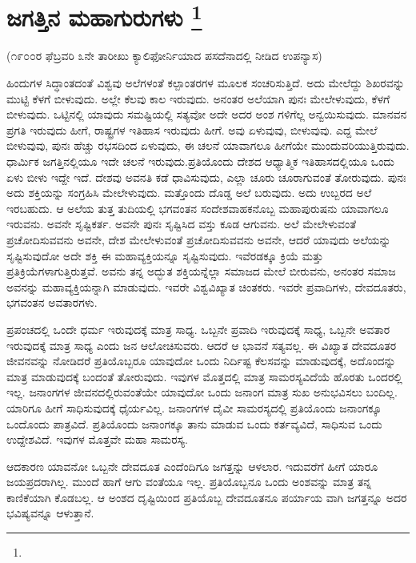 
\chapter[ಜಗತ್ತಿನ ಮಹಾಗುರುಗಳು]{ಜಗತ್ತಿನ ಮಹಾಗುರುಗಳು \protect\footnote{}}

\begin{center}
(೧೯೦೦ರ ಫೆಬ್ರವರಿ ೩ನೇ ತಾರೀಖು ಕ್ಯಾಲಿಫೋರ್ನಿಯಾದ ಪಸದೆನಾದಲ್ಲಿ ನೀಡಿದ ಉಪನ್ಯಾಸ)
\end{center}

ಹಿಂದುಗಳ ಸಿದ್ಧಾಂತದಂತೆ ವಿಶ್ವವು ಅಲೆಗಳಂತೆ ಕಲ್ಪಾಂತರಗಳ ಮೂಲಕ ಸಂಚರಿಸುತ್ತಿದೆ. ಅದು ಮೇಲೆದ್ದು ಶಿಖರವನ್ನು ಮುಟ್ಟಿ ಕೆಳಗೆ ಬೀಳುವುದು. ಅಲ್ಲೇ ಕೆಲವು ಕಾಲ ಇರುವುದು. ಅನಂತರ ಅಲೆಯಾಗಿ ಪುನಃ ಮೇಲೇಳುವುದು, ಕೆಳಗೆ ಬೀಳುವುದು. ಒಟ್ಟಿನಲ್ಲಿ ಯಾವುದು ಸಮಷ್ಟಿಯಲ್ಲಿ ಸತ್ಯವೋ ಅದೇ ಅದರ ಅಂಶ ಗಳಿಗೆಲ್ಲ ಅನ್ವಯಿಸುವುದು. ಮಾನವನ ಪ್ರಗತಿ ಇರುವುದು ಹೀಗೆ, ರಾಷ್ಟ್ರಗಳ ಇತಿಹಾಸ ಇರುವುದು ಹೀಗೆ. ಅವು ಏಳುವುವು, ಬೀಳುವುವು. ಎದ್ದ ಮೇಲೆ ಬೀಳುವುವು, ಪುನಃ ಹೆಚ್ಚು ರಭಸದಿಂದ ಏಳುವುದು, ಈ ಚಲನೆ ಯಾವಾಗಲೂ ಹೀಗೆಯೇ ಮುಂದುವರಿಯುತ್ತಿರುವುದು. ಧಾರ್ಮಿಕ ಜಗತ್ತಿನಲ್ಲಿಯೂ ಇದೇ ಚಲನೆ ಇರುವುದು.ಪ್ರತಿಯೊಂದು ದೇಶದ ಆಧ್ಯಾತ್ಮಿಕ ಇತಿಹಾಸದಲ್ಲಿಯೂ ಒಂದು ಏಳು ಬೀಳು ಇದ್ದೇ ಇದೆ. ದೇಶವು ಅವನತಿ ಕಡೆ ಧಾವಿಸುವುದು, ಎಲ್ಲಾ ಚೂರು ಚೂರಾಗುವಂತೆ ತೋರುವುದು. ಪುನಃ ಅದು ಶಕ್ತಿಯನ್ನು ಸಂಗ್ರಹಿಸಿ ಮೇಲೇಳುವುದು. ಮತ್ತೊಂದು ದೊಡ್ಡ ಅಲೆ ಬರುವುದು. ಅದು ಉಬ್ಬರದ ಅಲೆ ಇರಬಹುದು. ಆ ಅಲೆಯ ತುತ್ತ ತುದಿಯಲ್ಲಿ ಭಗವಂತನ ಸಂದೇಶವಾಹಕನೊಬ್ಬ ಮಹಾಪುರುಷನು ಯಾವಾಗಲೂ ಇರುವನು. ಅವನೇ ಸೃಷ್ಟಿಕರ್ತ. ಅವನೇ ಪುನಃ ಸೃಷ್ಟಿಸಿದ ವಸ್ತು ಕೂಡ ಆಗುವನು. ಅಲೆ ಮೇಲೇಳುವಂತೆ ಪ್ರಚೋದಿಸುವವನು ಅವನೇ, ದೇಶ ಮೇಲೇಳುವಂತೆ ಪ್ರಚೋದಿಸುವವನು ಅವನೇ, ಆದರೆ ಯಾವುದು ಅಲೆಯನ್ನು ಸೃಷ್ಟಿಸುವುದೋ ಅದೇ ಶಕ್ತಿ ಈ ಮಹಾವ್ಯಕ್ತಿಯನ್ನೂ ಸೃಷ್ಟಿಸುವುದು. ಇವೆರಡಕ್ಕೂ ಕ್ರಿಯೆ ಮತ್ತು ಪ್ರತಿಕ್ರಿಯೆಗಳಾಗುತ್ತಿರುತ್ತವೆ. ಅವನು ತನ್ನ ಅದ್ಭುತ ಶಕ್ತಿಯನ್ನೆಲ್ಲಾ ಸಮಾಜದ ಮೇಲೆ ಬೀರುವನು, ಅನಂತರ ಸಮಾಜ ಅವನನ್ನು ಮಹಾವ್ಯಕ್ತಿಯನ್ನಾಗಿ ಮಾಡುವುದು. ಇವರೇ ವಿಶ್ವವಿಖ್ಯಾತ ಚಿಂತಕರು. ಇವರೇ ಪ್ರವಾದಿಗಳು, ದೇವದೂತರು, ಭಗವಂತನ ಅವತಾರಗಳು.

ಪ್ರಪಂಚದಲ್ಲಿ ಒಂದೇ ಧರ್ಮ ಇರುವುದಕ್ಕೆ ಮಾತ್ರ ಸಾಧ್ಯ. ಒಬ್ಬನೇ ಪ್ರವಾದಿ ಇರುವುದಕ್ಕೆ ಸಾಧ್ಯ, ಒಬ್ಬನೇ ಅವತಾರ ಇರುವುದಕ್ಕೆ ಮಾತ್ರ ಸಾಧ್ಯ ಎಂದು ಜನ ಆಲೋಚಿಸುವರು. ಆದರೆ ಆ ಭಾವನೆ ಸತ್ಯವಲ್ಲ. ಈ ವಿಖ್ಯಾತ ದೇವದೂತರ ಜೀವನವನ್ನು ನೋಡಿದರೆ ಪ್ರತಿಯೊಬ್ಬರೂ ಯಾವುದೋ ಒಂದು ನಿರ್ದಿಷ್ಟ ಕೆಲಸವನ್ನು ಮಾಡುವುದಕ್ಕೆ, ಅದೊಂದನ್ನು ಮಾತ್ರ ಮಾಡುವುದಕ್ಕೆ ಬಂದಂತೆ ತೋರುವುದು. ಇವುಗಳ ಮೊತ್ತದಲ್ಲಿ ಮಾತ್ರ ಸಾಮರಸ್ಯವಿದೆಯೆ ಹೊರತು ಒಂದರಲ್ಲಿ ಇಲ್ಲ. ಜನಾಂಗಗಳ ಜೀವನದಲ್ಲಿರುವಂತೆಯೇ ಯಾವುದೋ ಒಂದು ಜನಾಂಗ ಮಾತ್ರ ಸುಖ ಅನುಭವಿಸಲು ಬಂದಿಲ್ಲ. ಯಾರಿಗೂ ಹೀಗೆ ಸಾಧಿಸುವುದಕ್ಕೆ ಧೈರ್ಯವಿಲ್ಲ. ಜನಾಂಗಗಳ ದೈವೀ ಸಾಮರಸ್ಯದಲ್ಲಿ ಪ್ರತಿಯೊಂದು ಜನಾಂಗಕ್ಕೂ ಒಂದೊಂದು ಪಾತ್ರವಿದೆ. ಪ್ರತಿಯೊಂದು ಜನಾಂಗಕ್ಕೂ ತಾನು ಮಾಡುವ ಒಂದು ಕರ್ತವ್ಯವಿದೆ, ಸಾಧಿಸುವ ಒಂದು ಉದ್ದೇಶವಿದೆ. ಇವುಗಳ ಮೊತ್ತವೇ ಮಹಾ ಸಾಮರಸ್ಯ.

ಆದಕಾರಣ ಯಾವನೋ ಒಬ್ಬನೇ ದೇವದೂತ ಎಂದೆಂದಿಗೂ ಜಗತ್ತನ್ನು ಆಳಲಾರ. ಇದುವರೆಗೆ ಹೀಗೆ ಯಾರೂ ಜಯಪ್ರದರಾಗಿಲ್ಲ. ಮುಂದೆ ಹಾಗೆ ಆಗು ವಂತೆಯೂ ಇಲ್ಲ. ಪ್ರತಿಯೊಬ್ಬನೂ ಒಂದು ಅಂಶವನ್ನು ಮಾತ್ರ ತನ್ನ ಕಾಣಿಕೆಯಾಗಿ ಕೊಡಬಲ್ಲ. ಆ ಅಂಶದ ದೃಷ್ಟಿಯಿಂದ ಪ್ರತಿಯೊಬ್ಬ ದೇವದೂತನೂ ಪರ್ಯಾಯ ವಾಗಿ ಜಗತ್ತನ್ನೂ ಅದರ ಭವಿಷ್ಯವನ್ನೂ ಆಳುತ್ತಾನೆ.

